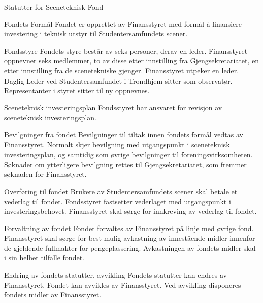 \begin{fond}{Statutter for Sceneteknisk Fond}
\begin{fondsparagraf}{Fondets Formål}
Fondet er opprettet av Finansstyret med formål å finansiere investering i teknisk
utstyr til Studentersamfundets scener.
\end{fondsparagraf}
\begin{fondsparagraf}{Fondsstyre}
Fondets styre består av seks personer, derav en leder. Finansstyret oppnevner seks medlemmer, to av disse etter innstilling fra Gjengsekretariatet, en etter innstilling fra de scenetekniske gjenger. Finansstyret utpeker en leder. Daglig Leder ved Studentersamfundet i Trondhjem sitter som observatør. Representanter i styret sitter til ny oppnevnes.
\end{fondsparagraf}
\begin{fondsparagraf}{Sceneteknisk investeringsplan}
Fondsstyret har ansvaret for revisjon av sceneteknisk investeringsplan.
\end{fondsparagraf}
\begin{fondsparagraf}{Bevilgninger fra fondet}
Bevilgninger til tiltak innen fondets formål vedtas av Finansstyret. Normalt
skjer bevilgning med utgangspunkt i sceneteknisk investeringsplan, og samtidig som øvrige bevilgninger til
foreningsvirksomheten. Søknader om ytterligere bevilgning rettes til Gjengsekretariatet, som fremmer søknaden for
Finansstyret.
\end{fondsparagraf}
\begin{fondsparagraf}{Overføring til fondet}
Brukere av Studentersamfundets scener skal betale et vederlag til fondet.
Fondsstyret fastsetter vederlaget med utgangspunkt i investeringsbehovet. Finansstyret skal sørge for innkreving av
vederlag til fondet.
\end{fondsparagraf}
\begin{fondsparagraf}{Forvaltning av fondet}
Fondet forvaltes av Finansstyret på linje med øvrige fond. Finansstyret skal
sørge for best mulig avkastning av innestående midler innenfor de gjeldende fullmakter for pengeplassering.
Avkastningen av fondets midler skal i sin helhet tilfalle fondet.
\end{fondsparagraf}
\begin{fondsparagraf}{Endring av fondets statutter, avvikling}
Fondets statutter kan endres av Finansstyret. Fondet kan avvikles av
Finansstyret. Ved avvikling disponeres fondets midler av Finansstyret.
\end{fondsparagraf}

\end{fond}


